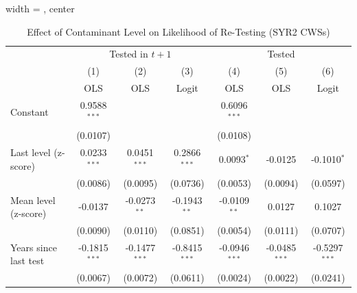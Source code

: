 
\begin{table}[htbp]
   
   \caption{\label{tab:monitoring_retesting} Effect of Contaminant Level on Likelihood of Re-Testing (SYR2 CWSs)}
   \bigskip
   
   \centering
   
   \begin{adjustbox}{width = \textwidth, center}
      
      
      \begin{tabular}{lcccccc}
         \toprule
         
          & \multicolumn{3}{c}{Tested in $t+1$} & \multicolumn{3}{c}{Tested}\\
         
                                & (1)             & (2)             & (3)             & (4)             & (5)             & (6)\\  
         
                                &  OLS            & OLS             & Logit           & OLS             & OLS             & Logit\\  
         
         \midrule 
         Constant               & 0.9588$^{***}$  &                 &                 & 0.6096$^{***}$  &                 &   \\   
                                & (0.0107)        &                 &                 & (0.0108)        &                 &   \\   
         Last level (z-score)   & 0.0233$^{***}$  & 0.0451$^{***}$  & 0.2866$^{***}$  & 0.0093$^{*}$    & -0.0125         & -0.1010$^{*}$\\   
                                & (0.0086)        & (0.0095)        & (0.0736)        & (0.0053)        & (0.0094)        & (0.0597)\\   
         Mean level (z-score)   & -0.0137         & -0.0273$^{**}$  & -0.1943$^{**}$  & -0.0109$^{**}$  & 0.0127          & 0.1027\\   
                                & (0.0090)        & (0.0110)        & (0.0851)        & (0.0054)        & (0.0111)        & (0.0707)\\   
         Years since last test  & -0.1815$^{***}$ & -0.1477$^{***}$ & -0.8415$^{***}$ & -0.0946$^{***}$ & -0.0485$^{***}$ & -0.5297$^{***}$\\   
                                & (0.0067)        & (0.0072)        & (0.0611)        & (0.0024)        & (0.0022)        & (0.0241)\\   
         

\end{tabular}
\end{adjustbox}
\end{table}
